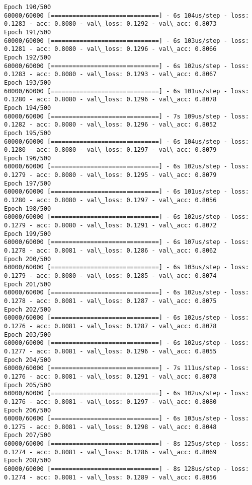 \documentclass[11pt]{article}
\begin{document}
\begin{Verbatim}[commandchars=\\\{\}]
Epoch 190/500
60000/60000 [==============================] - 6s 104us/step - loss: 0.1283 - acc: 0.8080 - val\_loss: 0.1292 - val\_acc: 0.8073
Epoch 191/500
60000/60000 [==============================] - 6s 103us/step - loss: 0.1281 - acc: 0.8080 - val\_loss: 0.1296 - val\_acc: 0.8066
Epoch 192/500
60000/60000 [==============================] - 6s 102us/step - loss: 0.1283 - acc: 0.8080 - val\_loss: 0.1293 - val\_acc: 0.8067
Epoch 193/500
60000/60000 [==============================] - 6s 101us/step - loss: 0.1280 - acc: 0.8080 - val\_loss: 0.1296 - val\_acc: 0.8078
Epoch 194/500
60000/60000 [==============================] - 7s 109us/step - loss: 0.1282 - acc: 0.8080 - val\_loss: 0.1296 - val\_acc: 0.8052
Epoch 195/500
60000/60000 [==============================] - 6s 104us/step - loss: 0.1280 - acc: 0.8080 - val\_loss: 0.1297 - val\_acc: 0.8079
Epoch 196/500
60000/60000 [==============================] - 6s 102us/step - loss: 0.1279 - acc: 0.8080 - val\_loss: 0.1295 - val\_acc: 0.8079
Epoch 197/500
60000/60000 [==============================] - 6s 101us/step - loss: 0.1280 - acc: 0.8080 - val\_loss: 0.1297 - val\_acc: 0.8056
Epoch 198/500
60000/60000 [==============================] - 6s 102us/step - loss: 0.1279 - acc: 0.8080 - val\_loss: 0.1291 - val\_acc: 0.8072
Epoch 199/500
60000/60000 [==============================] - 6s 107us/step - loss: 0.1278 - acc: 0.8081 - val\_loss: 0.1286 - val\_acc: 0.8062
Epoch 200/500
60000/60000 [==============================] - 6s 103us/step - loss: 0.1279 - acc: 0.8080 - val\_loss: 0.1285 - val\_acc: 0.8074
Epoch 201/500
60000/60000 [==============================] - 6s 102us/step - loss: 0.1278 - acc: 0.8081 - val\_loss: 0.1287 - val\_acc: 0.8075
Epoch 202/500
60000/60000 [==============================] - 6s 102us/step - loss: 0.1276 - acc: 0.8081 - val\_loss: 0.1287 - val\_acc: 0.8078
Epoch 203/500
60000/60000 [==============================] - 6s 102us/step - loss: 0.1277 - acc: 0.8081 - val\_loss: 0.1296 - val\_acc: 0.8055
Epoch 204/500
60000/60000 [==============================] - 7s 111us/step - loss: 0.1276 - acc: 0.8081 - val\_loss: 0.1291 - val\_acc: 0.8078
Epoch 205/500
60000/60000 [==============================] - 6s 102us/step - loss: 0.1276 - acc: 0.8081 - val\_loss: 0.1297 - val\_acc: 0.8080
Epoch 206/500
60000/60000 [==============================] - 6s 103us/step - loss: 0.1275 - acc: 0.8081 - val\_loss: 0.1298 - val\_acc: 0.8048
Epoch 207/500
60000/60000 [==============================] - 8s 125us/step - loss: 0.1274 - acc: 0.8081 - val\_loss: 0.1286 - val\_acc: 0.8069
Epoch 208/500
60000/60000 [==============================] - 8s 128us/step - loss: 0.1274 - acc: 0.8081 - val\_loss: 0.1289 - val\_acc: 0.8056

\end{Verbatim}
\end{document}
